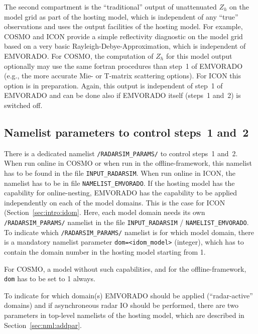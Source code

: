 \documentclass[10pt,a4paper,twoside,headinclude,footinclude,parskip=half]{scrartcl}
\newcommand{\myaktuellesection}{sec:intro}%
\newcommand{\labelsec}[1]{\label{#1}\renewcommand{\myaktuellesection}{#1}}%
\newcommand{\labelsec}[1]{\label{#1}}%
\newcommand{\srcform}[1]{\mbox{\texttt{#1}}\xspace}%
\begin{document}
The second compartment is the ``traditional'' output of unattenuated $Z_h$ on the model grid as part of the hosting model, which is
independent of any ``true'' observations and uses the output facilities of the hosting model. For example,
COSMO and ICON  provide a simple reflectivity diagnostic on the model grid based on a very basic Rayleigh-Debye-Approximation, which is
independent of EMVORADO. For COSMO, the computation of $Z_h$ for this model output optionally may use the same
fortran procedures than step~1 of EMVORADO (e.g., the more accurate Mie- or T-matrix scattering options). For ICON this option is in preparation.
Again, this output is independent of step~1 of EMVORADO and can be done also if EMVORADO
itself (steps~1 and~2) is switched off.


\subsection{Namelist parameters to control steps~1 and~2}

\labelsec{sec:nmlradarsim}

There is a dedicated namelist \srcform{/RADARSIM_PARAMS/} to control steps~1 and~2. When run online in COSMO or when run in the offline-framework, this namelist has to be found in the file
\srcform{INPUT_RADARSIM}. When run online in ICON, the namelist has to be in file \srcform{NAMELIST_EMVORADO}. If the hosting model has the capability for online-nesting, EMVORADO has the capability
to be applied independently on each of the model domains. This is the case for ICON (Section~\ref{sec:intro:idom}.
Here, each model domain needs its own \srcform{/RADARSIM_PARAMS/} namelist in the file \srcform{INPUT_RADARSIM} / \srcform{NAMELIST_EMVORADO}.
To indicate which \srcform{/RADARSIM_PARAMS/} namelist is for which model domain, there is a
mandatory namelist parameter \srcform{dom=<idom_model>} (integer), which has to contain the domain
number in the hosting model starting from 1.

For COSMO, a model without such capabilities, and for the offline-framework, \srcform{dom} has to be set to 1 always.

To indicate for which domain(s) EMVORADO should be applied (``radar-active'' domains) and if asynchroneous radar IO
should be performed, there are two parameters in top-level namelists of the hosting model, which
are described in Section~\ref{sec:nml:addpar}.
\end{document}
